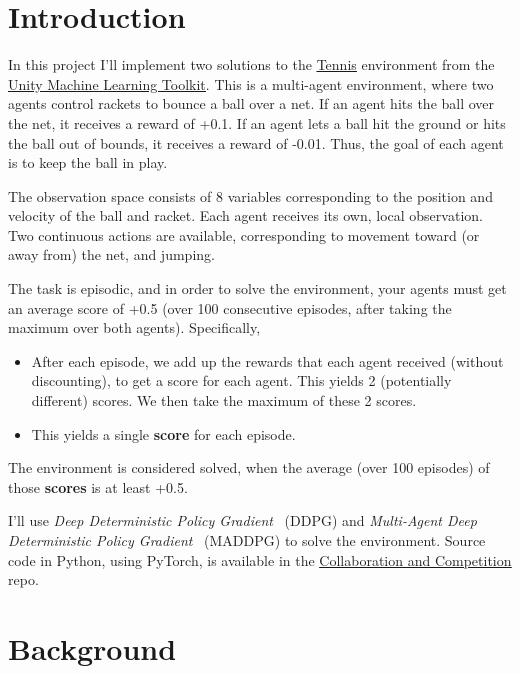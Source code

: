 \documentclass[sigchi]{acmart}
\begin{document}
\section{Introduction}

In this project I'll implement two solutions to the 
\href{https://github.com/Unity-Technologies/ml-agents/blob/master/docs/Learning-Environment-Examples.md#tennis}{\underline{Tennis}}
environment from the 
\href{https://unity3d.ai}{\underline{Unity Machine Learning Toolkit}}.
This is a multi-agent environment, where two agents control rackets to bounce a ball over a net. If an agent hits the ball over the net, it receives a reward of +0.1.  If an agent lets a ball hit the ground or hits the ball out of bounds, it receives a reward of -0.01.  Thus, the goal of each agent is to keep the ball in play.

The observation space consists of 8 variables corresponding to the position and velocity of the ball and racket. Each agent receives its own, local observation.  Two continuous actions are available, corresponding to movement toward (or away from) the net, and jumping. 

The task is episodic, and in order to solve the environment, your agents must get an average score of +0.5 (over 100 consecutive episodes, after taking the maximum over both agents). Specifically,
\begin{itemize}
	\item  After each episode, we add up the rewards that each agent received (without discounting), to get a score for each agent. This yields 2 (potentially different) scores. We then take the maximum of these 2 scores.
	\item  This yields a single \textbf{score} for each episode.
\end{itemize}
The environment is considered solved, when the average (over 100 episodes) of those \textbf{scores} is at least +0.5.



I'll use 
{\em Deep Deterministic Policy Gradient}~\cite{Silver:2014:DPG:3044805.3044850} (DDPG) 
and
{\em Multi-Agent Deep Deterministic Policy Gradient}~\cite{DBLP:journals/corr/LoweWTHAM17} (MADDPG) 
to solve the environment.
Source code in Python, using PyTorch, is available 
in the  
\href{https://github.com/bobflagg/Collaboration-and-Competition}{\underline{Collaboration and Competition}}
repo.





\section{Background}
\end{document}
